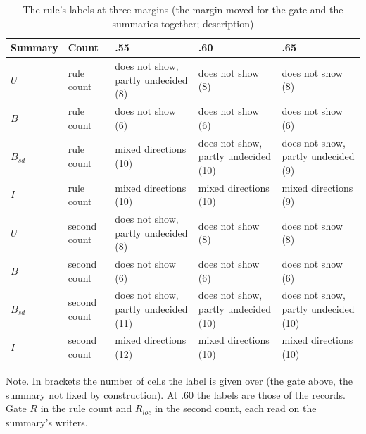 \begin{table}[htbp]
\caption{The rule's labels at three margins (the margin moved for the gate and the summaries together; description)}
\label{tab:marginlabels}
\footnotesize
\begin{tabularx}{\linewidth}{@{}llXXX@{}}
\toprule
Summary & Count & .55 & .60 & .65 \\
\midrule
$U$ & rule count & does not show, partly undecided (8) & does not show (8) & does not show (8) \\
$B$ & rule count & does not show (6) & does not show (6) & does not show (6) \\
$B_{sd}$ & rule count & mixed directions (10) & does not show, partly undecided (10) & does not show, partly undecided (9) \\
$I$ & rule count & mixed directions (10) & mixed directions (10) & mixed directions (9) \\
$U$ & second count & does not show, partly undecided (8) & does not show (8) & does not show (8) \\
$B$ & second count & does not show (6) & does not show (6) & does not show (6) \\
$B_{sd}$ & second count & does not show, partly undecided (11) & does not show, partly undecided (10) & does not show, partly undecided (10) \\
$I$ & second count & mixed directions (12) & mixed directions (10) & mixed directions (10) \\
\bottomrule
\end{tabularx}
\par\smallskip\footnotesize Note. In brackets the number of cells the label is given over (the gate above, the summary not fixed by construction). At .60 the labels are those of the records. Gate $R$ in the rule count and $R_{loc}$ in the second count, each read on the summary's writers.
\end{table}

